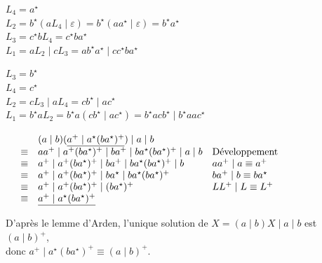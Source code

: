 \begin{corrections}

  \begin{questions}

  \item
    $L_4 = a^\star$\\
    $L_2 = b^\star(aL_4 \mid \varepsilon) = b^\star(a a^\star \mid \varepsilon)= b^\star a^\star$\\
    $L_3 = c^\star bL_4 = c^\star b a^\star$\\
    $L_1 = aL_2 \mid cL_3 = ab^\star a^\star \mid cc^\star b a^\star$
 
  \item
    $L_3 = b^\star$\\
    $L_4 = c^\star$\\
    $L_2 = cL_3 \mid aL_4 = cb^\star \mid ac^\star$\\
    $L_1 = b^\star aL_2 = b^\star a(cb^\star \mid ac^\star) = b^\star acb^\star \mid b^\star aa c^\star$
 
  \item $\begin{array}[t]{rcll}
    &      & (a \mid b) (\underline{a^+ \mid  a^\star  (ba^\star )^+}) \mid a\mid b\\
    &\equiv& a a^+ \mid  a^+  (ba^\star )^+ \mid ba^+ \mid  ba^\star  (ba^\star )^+ \mid a\mid b &\text{Développement}\\
    &\equiv& a^+ \mid  a^+  (ba^\star )^+ \mid ba^+ \mid  ba^\star  (ba^\star )^+ \mid b & aa^+ \mid a \equiv a^+\\
    &\equiv& a^+ \mid  a^+  (ba^\star )^+ \mid ba^\star \mid  ba^\star  (ba^\star )^+ & ba^+ \mid b \equiv ba^\star\\
    &\equiv& a^+ \mid  a^+  (ba^\star )^+ \mid (ba^\star )^+ &  LL^+ \mid L \equiv L^+\\
    &\equiv& \underline{a^+ \mid  a^\star  (ba^\star )^+} \\
  \end{array}$
 
  \item D'après le lemme d'Arden, l'unique solution de $X = (a \mid b) X \mid a\mid b$ est $(a \mid b)^+$, \\donc $a^+ \mid  a^\star  (ba^\star )^+ \equiv (a \mid b)^+$. 

  \end{questions}

\end{corrections}

\endgroup
\endinput
